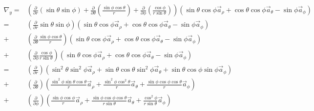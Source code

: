                 \begin{align*}
                    \nabla_y = & \left(\frac{\partial}{\partial r}\left(\sin\theta\sin\phi\right) 
                                + \frac{\partial}{\partial \theta}\left(\frac{\sin\phi\cos\theta}{r}\right)
                                + \frac{\partial}{\partial \phi}\left(\frac{\cos\phi}{r\sin\theta}\right)\right)
                                \left(\sin\theta\cos\phi\vec{a}_\rho + \cos\theta\cos\phi\vec{a}_\theta - \sin\phi\vec{a}_\phi\right) \\
                            = & \left(\frac{\partial}{\partial r}\sin\theta\sin\phi\right)\left(
                                \sin\theta\cos\phi\vec{a}_\rho + \cos\theta\cos\phi\vec{a}_\theta - \sin\phi\vec{a}_\phi
                            \right) \\
                            + & \left(\frac{\partial}{\partial \theta}\frac{\sin\phi\cos\theta}{r}\right)\left(
                                \sin\theta\cos\phi\vec{a}_\rho + \cos\theta\cos\phi\vec{a}_\theta - \sin\phi\vec{a}_\phi
                            \right) \\
                            + & \left(\frac{\partial}{\partial \phi}\frac{\cos\phi}{r\sin\theta}\right)\left(
                                \sin\theta\cos\phi\vec{a}_\rho + \cos\theta\cos\phi\vec{a}_\theta - \sin\phi\vec{a}_\phi
                            \right) \\
                            = & \left(\frac{\partial}{\partial r}\right)\left(
                                    \sin^2\theta\sin^2\phi\vec{a}_\rho +
                                    \sin\theta\cos\theta\sin^2\phi\vec{a}_\theta +
                                    \sin\theta\cos\phi\sin\phi\vec{a}_\phi
                                \right) \\
                            + & \left(\frac{\partial}{\partial \theta}\right)\left(
                                    \frac{\sin^2\phi\sin\theta\cos\theta}{r}\vec{a}_\rho + 
                                    \frac{\sin^2\phi\cos^2\theta}{r}\vec{a}_\theta + 
                                    \frac{\sin\phi\cos\phi\cos\theta}{r}\vec{a}_\phi 
                                \right)\\
                            + & \left(\frac{\partial}{\partial \phi}\right)\left(
                                    \frac{\sin\phi\cos\phi}{r}\vec{a}_\rho + 
                                    \frac{\sin\phi\cos\phi\cos\theta}{r\sin\theta}\vec{a}_\theta + 
                                    \frac{\cos^2\phi}{r\sin\theta}\vec{a}_\phi
                                \right)
                \end{align*}
